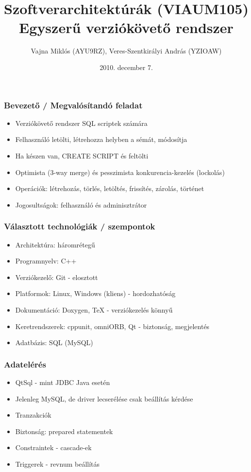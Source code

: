 \documentclass[hyperref={pdfpagelabels=false}]{beamer}
\author{Vajna Mikl\'os (AYU9RZ), Veres-Szentkir\'alyi Andr\'as (YZIOAW)}
\begin{document}
\title{Szoftverarchitektúrák (VIAUM105)\\Egyszerű verziókövető rendszer}
\date{2010. december 7.}

\frame{\titlepage}

\begin{frame}
\frametitle{Bevezető / Megvalósítandó feladat}
\begin{itemize}
\item Verziókövető rendszer SQL scriptek számára
\item Felhasználó letölti, létrehozza helyben a sémát, módosítja
\item Ha készen van, CREATE SCRIPT és feltölti
\item Optimista (3-way merge) és pesszimista konkurencia-kezelés (lockolás)
\item Operációk: létrehozás, törlés, letöltés, frissítés, zárolás, történet
\item Jogosultságok: felhasználó és adminisztrátor
\end{itemize}
\end{frame}

\begin{frame}
\frametitle{Választott technológiák / szempontok}
\begin{itemize}
\item Architektúra: háromrétegű
\item Programnyelv: C++
\item Verziókezelő: Git - elosztott
\item Platformok: Linux, Windows (kliens) - hordozhatóság
\item Dokumentáció: Doxygen, \TeX{} - verziókezelés könnyű
\item Keretrendszerek: cppunit, omniORB, Qt - biztonság, megjelentés
\item Adatbázis: SQL (MySQL)
\end{itemize}
\end{frame}

\begin{frame}
\frametitle{Adatelérés}
\begin{itemize}
\item QtSql - mint JDBC Java esetén
\item Jelenleg MySQL, de driver lecserélése csak beállítás kérdése
\item Tranzakciók
\item Biztonság: prepared statementek
\item Constraintek - cascade-ek
\item Triggerek - revnum beállítás
\end{itemize}
\end{frame}
\end{document}
